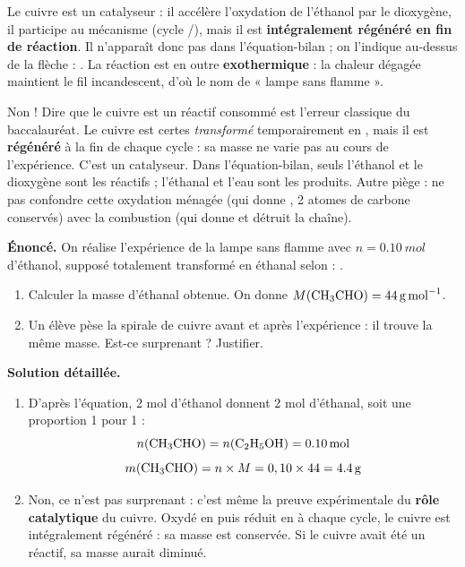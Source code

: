 \documentclass[11pt]{article}
\newcommand{\cle}[1]{{\popxbold\color{popdark}#1}}
\begin{document}
\begin{propriete}
Le cuivre est un \cle{catalyseur} : il accélère l'oxydation de l'éthanol par le dioxygène, il participe au mécanisme (cycle /), mais il est \textbf{intégralement régénéré en fin de réaction}. Il n'apparaît donc pas dans l'équation-bilan ; on l'indique au-dessus de la flèche : \ce{->[Cu]}. La réaction est en outre \textbf{exothermique} : la chaleur dégagée maintient le fil incandescent, d'où le nom de « lampe sans flamme ».
\end{propriete}

\begin{attention}
Non ! Dire que le cuivre est un réactif consommé est l'erreur classique du baccalauréat. Le cuivre est certes \emph{transformé} temporairement en , mais il est \textbf{régénéré} à la fin de chaque cycle : sa masse ne varie pas au cours de l'expérience. C'est un \cle{catalyseur}. Dans l'équation-bilan, seuls l'éthanol et le dioxygène sont les réactifs ; l'éthanal et l'eau sont les produits. Autre piège : ne pas confondre cette oxydation ménagée (qui donne , 2 atomes de carbone conservés) avec la combustion (qui donne  et détruit la chaîne).
\end{attention}

\begin{exoresolu}
\textbf{Énoncé.} On réalise l'expérience de la lampe sans flamme avec $n = \SI{0,10}{mol}$ d'éthanol, supposé totalement transformé en éthanal selon : .
\begin{enumerate}
\item Calculer la masse d'éthanal obtenue. On donne $M(\ce{CH3CHO}) = \SI{44}{g.mol^{-1}}$.
\item Un élève pèse la spirale de cuivre avant et après l'expérience : il trouve la même masse. Est-ce surprenant ? Justifier.
\end{enumerate}
\tcblower
\textbf{Solution détaillée.}
\begin{enumerate}
\item D'après l'équation, 2 mol d'éthanol donnent 2 mol d'éthanal, soit une proportion 1 pour 1 :
\[ n(\ce{CH3CHO}) = n(\ce{C2H5OH}) = \SI{0,10}{mol} \]
\[ m(\ce{CH3CHO}) = n \times M = 0,10 \times 44 = \SI{4,4}{g} \]
\item Non, ce n'est pas surprenant : c'est même la preuve expérimentale du \textbf{rôle catalytique} du cuivre. Oxydé en  puis réduit en  à chaque cycle, le cuivre est intégralement régénéré : sa masse est conservée. Si le cuivre avait été un réactif, sa masse aurait diminué.
\end{enumerate}
\end{exoresolu}
\end{document}
